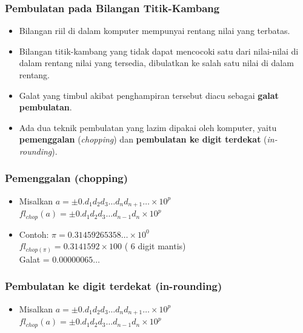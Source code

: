 \documentclass[pdflatex,compress]{beamer}
\begin{document}
\begin{frame}
	\frametitle{Pembulatan pada Bilangan Titik-Kambang}
	\begin{itemize}
		\item Bilangan riil di dalam komputer mempunyai rentang nilai yang terbatas.
		\item Bilangan titik-kambang yang tidak dapat mencocoki satu dari nilai-nilai di dalam rentang nilai yang tersedia, dibulatkan ke salah satu nilai di dalam rentang.
		\item Galat yang timbul akibat penghampiran tersebut diacu sebagai \textbf{galat pembulatan}.
		\item Ada dua teknik pembulatan yang lazim dipakai oleh komputer, yaitu \textbf{pemenggalan} (\textit{chopping}) dan \textbf{pembulatan ke digit terdekat} (\textit{in-rounding}).
	\end{itemize}
\end{frame}

\begin{frame}
	\frametitle{Pemenggalan (chopping)}
	\begin{itemize}
		\item Misalkan $ a = \pm 0.d_1 d_2 d_3 \dots d_nd_{n+1} \dots \times 10^p $\\
		$ fl_{chop}(a) = \pm 0.d_1 d_2 d_3 \dots d_{n-1}d_n \times 10^p $
		\item Contoh: $ \pi = 0.31459265358 \dots \times 10^0 $\\
		$ fl_{chop(\pi)} = 0.3141592 × 100 $ ( 6 digit mantis)\\
		Galat = $ 0.00000065\dots $
	\end{itemize}
\end{frame}

\begin{frame}
	\frametitle{Pembulatan ke digit terdekat (in-rounding)}
	\begin{itemize}
		\item Misalkan $ a = \pm 0.d_1 d_2 d_3 \dots d_nd_{n+1} \dots \times 10^p $\\
		$ fl_{chop}(a) = \pm 0.d_1 d_2 d_3 \dots d_{n-1}d_n \times 10^p $
	\end{itemize}
\end{frame}
	
\end{document}
